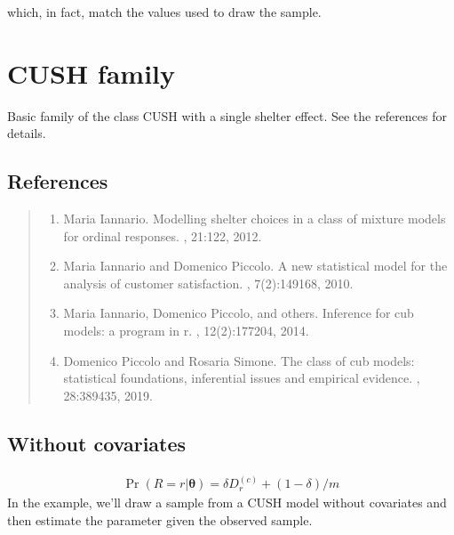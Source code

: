 \documentclass[letterpaper,10pt,english]{sphinxmanual}
\begin{document}
\sphinxAtStartPar
which, in fact, match the values used to draw the sample.


\section{CUSH family}
\label{\detokenize{manual:cush-family}}
\sphinxAtStartPar
Basic family of the class CUSH with a single shelter effect.
See the references for details.


\subsection{References}
\label{\detokenize{manual:id78}}\begin{quote}
\begin{enumerate}
%
\setcounter{enumi}{0}
\item {} 
\sphinxAtStartPar
Maria Iannario. Modelling shelter choices in a class of mixture models for ordinal responses. , 21:1\textendash{}22, 2012.

\item {} 
\sphinxAtStartPar
Maria Iannario and Domenico Piccolo. A new statistical model for the analysis of customer satisfaction. , 7(2):149\textendash{}168, 2010.

\item {} 
\sphinxAtStartPar
Maria Iannario, Domenico Piccolo, and others. Inference for cub models: a program in r. , 12(2):177\textendash{}204, 2014.

\item {} 
\sphinxAtStartPar
Domenico Piccolo and Rosaria Simone. The class of cub models: statistical foundations, inferential issues and empirical evidence. , 28:389\textendash{}435, 2019.

\end{enumerate}
\end{quote}


\subsection{Without covariates}
\label{\detokenize{manual:id116}}\begin{equation*}
\begin{split}\Pr(R=r|\pmb\theta) = \delta D_r^{(c)} + (1-\delta)/m\end{split}
\end{equation*}
\sphinxAtStartPar
In the example, we’ll draw a sample from a CUSH model without covariates and
then estimate the parameter given the observed sample.
\end{document}
